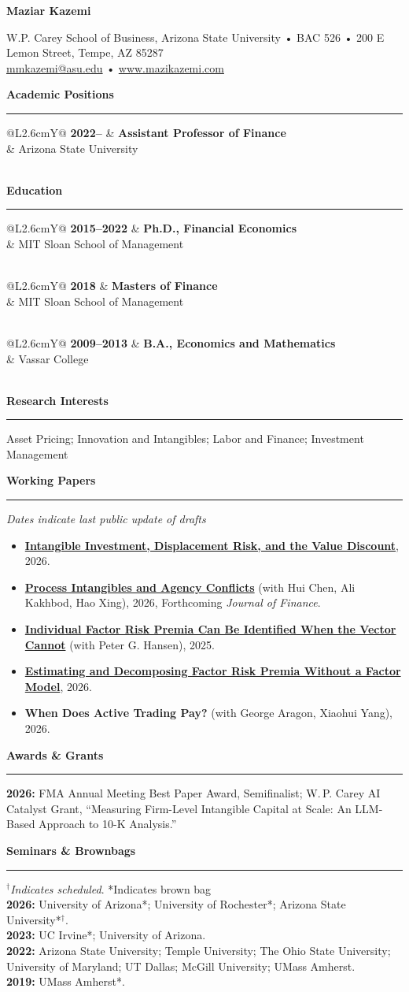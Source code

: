 \documentclass[11pt]{article}
\makeatletter
\newcommand{\sectionline}{\vspace{-7pt}\noindent\rule{\textwidth}{0.4pt}\vspace{6pt}}
\newcommand{\cvsection}[1]{\vspace{10pt}\textbf{\large #1}\par\sectionline}
\newcommand{\cvitem}[4]{%
  \begin{tabularx}{\textwidth}{@{}L{2.6cm}Y@{}}%
    \textbf{#1} & \textbf{#2} \\
                & #3 \\
    \multicolumn{2}{@{}l@{}}{#4} \\
  \end{tabularx}\vspace{-5pt}%
}
\newenvironment{tightlist}{\begin{itemize}[left=1.2em,itemsep=2pt,topsep=2pt]}{\end{itemize}}
\newcommand{\name}[1]{\begin{center}\LARGE \textbf{#1}\end{center}}
\newcommand{\contact}[1]{\begin{center}#1\end{center}\vspace{6pt}}
\makeatother
\begin{document}
\name{Maziar Kazemi}
\contact{W.P. Carey School of Business, Arizona State University • BAC 526 • 200 E Lemon Street, Tempe, AZ 85287 \\
\href{mailto:mmkazemi@asu.edu}{mmkazemi@asu.edu} • \url{www.mazikazemi.com}}


\cvsection{Academic Positions}
\cvitem{2022–}{Assistant Professor of Finance}{Arizona State University}{}




\cvsection{Education}
\cvitem{2015–2022}{Ph.D., Financial Economics}{MIT Sloan School of Management}{}
\cvitem{2018}{Masters of Finance}{MIT Sloan School of Management}{}
\cvitem{2009–2013}{B.A., Economics and Mathematics}{Vassar College}{}


\cvsection{Research Interests}
Asset Pricing; Innovation and Intangibles; Labor and Finance; Investment Management


\cvsection{Working Papers}
\footnotesize{\textit{Dates indicate last public update of drafts}}
\begin{tightlist}
  \item \textbf{\href{https://papers.ssrn.com/sol3/papers.cfm?abstract_id=3988890}{Intangible Investment, Displacement Risk, and the Value Discount}}, 2026.
  \item \textbf{\href{https://papers.ssrn.com/sol3/papers.cfm?abstract_id=4351116}{Process Intangibles and Agency Conflicts}} (with Hui Chen, Ali Kakhbod, Hao Xing), 2026, Forthcoming \textit{Journal of Finance}.


  \item \textbf{\href{https://papers.ssrn.com/sol3/papers.cfm?abstract_id=3934624}{Individual Factor Risk Premia Can Be Identified When the Vector Cannot}} (with Peter G. Hansen), 2025.
  \item \textbf{\href{https://papers.ssrn.com/sol3/papers.cfm?abstract_id=5686704}{Estimating and Decomposing Factor Risk Premia Without a Factor Model}}, 2026.
  \item \textbf{When Does Active Trading Pay?} (with George Aragon, Xiaohui Yang), 2026.
\end{tightlist}


\cvsection{Awards \& Grants}
\textbf{2026:} FMA Annual Meeting Best Paper Award, Semifinalist; W.\,P. Carey AI Catalyst Grant, ``Measuring Firm-Level Intangible Capital at Scale: An LLM-Based Approach to 10-K Analysis.''


\vspace{2cm}
\cvsection{Seminars \& Brownbags}
\footnotesize{$^\dagger$\textit{Indicates scheduled}. *Indicates brown bag}\\
\textbf{2026:} University of Arizona*; University of Rochester*; Arizona State University*$^\dagger$. \\
\textbf{2023:} UC Irvine*; University of Arizona. \\
\textbf{2022:} Arizona State University; Temple University; The Ohio State University; University of Maryland; UT Dallas; McGill University; UMass Amherst. \\
\textbf{2019:} UMass Amherst*.
\end{document}
